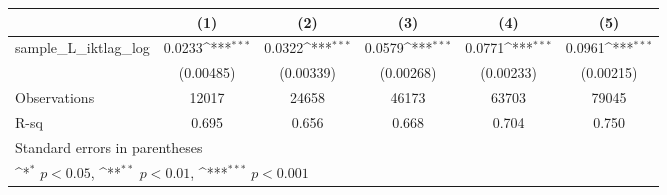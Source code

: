 {
\def\sym#1{\ifmmode^{#1}\else\(^{#1}\)\fi}
\begin{tabular}{l*{5}{c}}
\hline\hline
                &\multicolumn{1}{c}{(1)}         &\multicolumn{1}{c}{(2)}         &\multicolumn{1}{c}{(3)}         &\multicolumn{1}{c}{(4)}         &\multicolumn{1}{c}{(5)}         \\
\hline
sample\_L\_iktlag\_log&   0.0233\sym{***}&   0.0322\sym{***}&   0.0579\sym{***}&   0.0771\sym{***}&   0.0961\sym{***}\\
                &(0.00485)         &(0.00339)         &(0.00268)         &(0.00233)         &(0.00215)         \\
\hline
Observations    &    12017         &    24658         &    46173         &    63703         &    79045         \\
R-sq            &    0.695         &    0.656         &    0.668         &    0.704         &    0.750         \\
\hline\hline
\multicolumn{6}{l}{\footnotesize Standard errors in parentheses}\\
\multicolumn{6}{l}{\footnotesize \sym{*} \(p<0.05\), \sym{**} \(p<0.01\), \sym{***} \(p<0.001\)}\\
\end{tabular}
}
